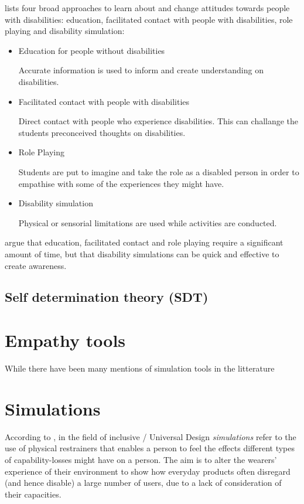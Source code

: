 \textcite{Jordan2010} lists four broad approaches to learn about and change attitudes towards people with disabilities: education, facilitated contact with people with disabilities, role playing and disability simulation: 
\begin{itemize}
    \item Education for people without disabilities
    
    Accurate information is used to inform and create understanding on disabilities.
    \item Facilitated contact with people with disabilities
    
    Direct contact with people who experience disabilities. This can challange the students preconceived thoughts on disabilities. 
    \item Role Playing
    
    Students are put to imagine and take the role as a disabled person in order to empathise with some of the experiences they might have.
    \item Disability simulation
    
    Physical or sensorial limitations are used while activities are conducted.
\end{itemize}

\textcite{Jordan2010} argue that education, facilitated contact and role playing require a significant amount of time, but that disability simulations can be quick and effective to create awareness.



\subsection{Self determination theory (SDT)}
\section{Empathy tools}
While there have been many mentions of simulation tools in the litterature \parencite{GoodmanDeane:2007it, Giakoumis2014, Cardoso2012}
\section{Simulations}
According to \textcite{Cardoso2012}, in the field of inclusive / Universal Design \textit{simulations} refer to the use of physical restrainers that enables a person to feel the effects different types of capability-losses might have on a person. The aim is to alter the wearers’ experience of their environment to show how everyday products often disregard (and hence disable) a large number of users, due to a lack of consideration of their capacities.

